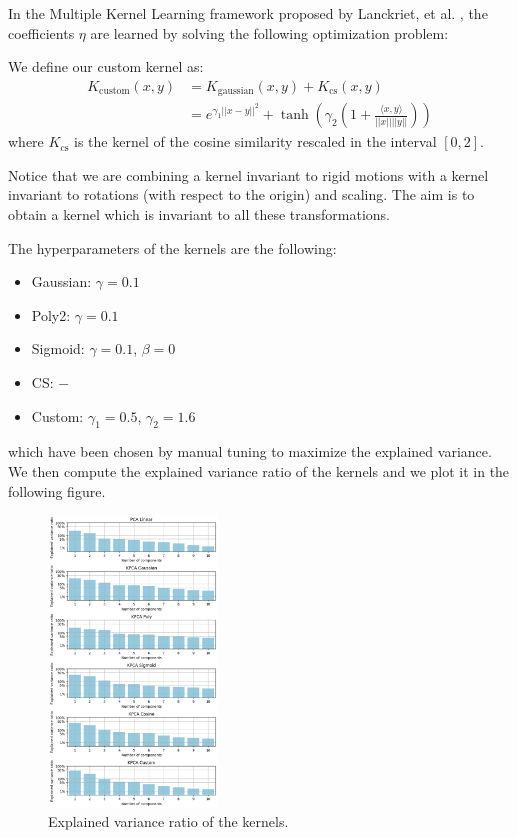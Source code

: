 In the Multiple Kernel Learning framework proposed by Lanckriet, et al. \cite{lanckriet2004learning},
the coefficients $\eta$ are learned by solving the following optimization problem:





We define our custom kernel as:
\begin{align*}
    K_{\text{custom}}(x, y) &= K_{\text{gaussian}}(x, y) + K_{\text{cs}}(x, y) \\
    &= e^{\gamma_1 ||x-y||^2} + \tanh( \gamma_2 \left( 1 + \frac{\langle x, y \rangle}{||x|| ||y||} \right) )
\end{align*}
where $K_{\text{cs}}$ is the kernel of the cosine similarity rescaled
in the interval $[0, 2]$.

Notice that we are combining a kernel invariant to rigid motions with 
a kernel invariant to rotations (with respect to the origin) and scaling.
The aim is to obtain a kernel which is invariant to all these transformations.

The hyperparameters of the kernels are the following:
\begin{itemize}
    \item Gaussian: $\gamma = 0.1$
    \item Poly2:    $\gamma = 0.1$
    \item Sigmoid:  $\gamma = 0.1$, $\beta = 0$
    \item CS:       $-$
    \item Custom:   $\gamma_1 = 0.5$, $\gamma_2 = 1.6$
\end{itemize}
which have been chosen by manual tuning to maximize the explained variance.
We then compute the explained variance ratio of the kernels and we
plot it in the following figure.
\begin{figure}[H]
    \centering
    \includegraphics[width=0.4\textwidth]{figures/expvar_ratio_plot.png}
    \caption{Explained variance ratio of the kernels.}
\end{figure}

